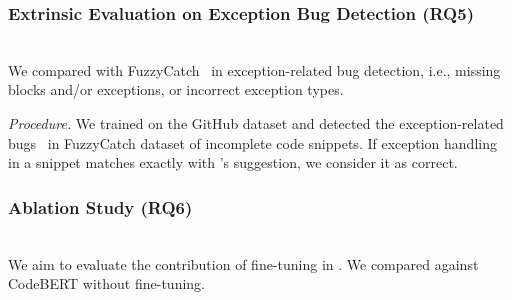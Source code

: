 




%

\vspace{2pt}
\subsubsection{Extrinsic Evaluation on Exception Bug Detection (RQ5)}~\\
 We compared with
FuzzyCatch~\cite{xrank-fse20} in exception-related bug detection,
i.e., missing  blocks and/or exceptions, or incorrect
exception types.



{\em Procedure.} We trained {\tool} on the GitHub dataset and detected
the exception-related bugs~\cite{fuzzycatchbugs} in FuzzyCatch dataset of
incomplete code snippets. If exception handling in a snippet
matches exactly with {\tool}'s suggestion, we consider it as correct.



\vspace{2pt}
\subsubsection{Ablation Study (RQ6)}~\\
We aim to evaluate the contribution of fine-tuning in {\tool}. We
compared {\tool} against CodeBERT without fine-tuning.
